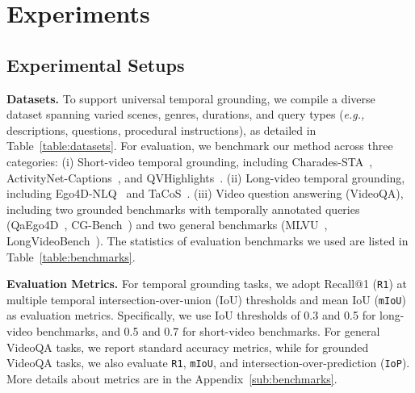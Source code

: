 \section{Experiments}
\label{sec_exp}

\subsection{Experimental Setups}

\noindent \textbf{Datasets.} 
To support universal temporal grounding, we compile a diverse dataset spanning varied scenes, genres, durations, and query types ({\em e.g.,} descriptions, questions, procedural instructions), as detailed in Table~\ref{table:datasets}.
For evaluation, we benchmark our method across three categories: 
(i) Short-video temporal grounding, including Charades-STA~\cite{sigurdsson2016hollywood}, ActivityNet-Captions~\cite{krishna2017dense}, and QVHighlights~\cite{lei2021detecting}.
(ii) Long-video temporal grounding, including Ego4D-NLQ~\cite{grauman2022ego4d} and TaCoS~\cite{regneri2013grounding}.
(iii) Video question answering (VideoQA), including two grounded benchmarks with temporally annotated queries (QaEgo4D~\cite{barmann2022did}, CG-Bench~\cite{cgbench}) and two general benchmarks (MLVU~\cite{mlvu}, LongVideoBench~\cite{longvideobench}). 
The statistics of evaluation benchmarks we used are listed in Table~\ref{table:benchmarks}.

\noindent \textbf{Evaluation Metrics.}
For temporal grounding tasks, we adopt Recall@1 (\texttt{R1}) at multiple temporal intersection-over-union (IoU) thresholds and mean IoU (\texttt{mIoU}) as evaluation metrics. 
Specifically, we use IoU thresholds of 0.3 and 0.5 for long-video benchmarks, 
and 0.5 and 0.7 for short-video benchmarks. For general VideoQA tasks, 
we report standard accuracy metrics, while for grounded VideoQA tasks, we also evaluate \texttt{R1}, \texttt{mIoU}, and intersection-over-prediction (\texttt{IoP}). More details about metrics are in the Appendix~\ref{sub:benchmarks}.

